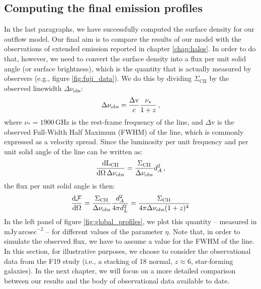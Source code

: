 \subsection{Computing the final emission profiles}


In the last paragraphs, we have successfully computed the \CII surface density for our outflow model. Our final aim is to compare the results of our model with the observations of extended \CII emission reported in chapter \ref{chap:halos}. In order to do that, however, we need to convert the surface density into a flux per unit solid angle (or surface brightness), which is the quantity that is actually measured by observers (e.g., figure \ref{fig:fuji_data}). We do this by dividing $\Sigma_\mathrm{CII}$ by the observed \CII linewidth $\Delta\nu_\mathrm{obs}$:
\begin{align}
\Delta\nu_\mathrm{obs} = \frac{\Delta {\rm v}}{c} \frac{\nu_*}{1+z}\,,
\end{align}
where $\nu_*=1900\,\mathrm{GHz}$ is the rest-frame frequency of the \CII line, and $\Delta\mathrm{v}$ is the observed Full-Width Half Maximum (FWHM) of the line, which is commonly expressed as a velocity spread. Since the luminosity per unit frequency and per unit solid angle of the \CII line can be written as: 
\begin{align}
\frac{\mathrm{d}\mathrm{L}_\mathrm{CII}}{\mathrm{d} \Omega \, \Delta \nu_\mathrm{obs}} = \frac{\Sigma_\mathrm{CII}}{\Delta \nu_\mathrm{obs}}d_A^2\,,
\end{align}
the flux per unit solid angle is then:
\begin{align}
\frac{\mathrm{d}{\cal F}}{\mathrm{d}\Omega} = \frac{\Sigma_\mathrm{CII}}{\Delta \nu_\mathrm{obs}}\frac{d_A^2}{4\pi d_L^2 } = \frac{\Sigma_\mathrm{CII}}{4\pi\Delta \nu_\mathrm{obs}(1+z)^4}
\end{align}
In the left panel of figure \ref{fig:global_profiles}, we plot this quantity -- measured in $\mathrm{mJy\,arcsec}^{-2}$ -- for different values of the parameter $\eta$. Note that, in order to simulate the observed flux, we have to assume a value for the FWHM of the \CII line. In this section, for illustrative purposes, we choose to consider the observational data from the F19 study \citep{Fujimoto19} (i.e., a stacking of 18 normal, $z\approx 6$, star-forming galaxies). In the next chapter, we will focus on a more detailed comparison between our results and the body of observational data available to date. 

